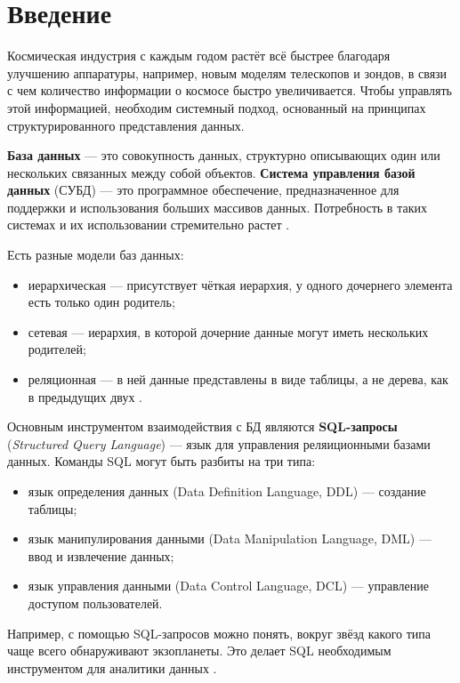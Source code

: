 \documentclass[14pt,a4paper]{extarticle}
\begin{document}
	\tableofcontents
	
	\newpage
	
	\justifying
	
	\section*{Введение}
	Космическая индустрия с каждым годом растёт всё быстрее благодаря улучшению аппаратуры, например, новым моделям телескопов и зондов, в связи с чем количество информации о космосе быстро увеличивается. Чтобы управлять этой информацией, необходим системный подход, основанный на принципах структурированного представления данных.
	
	\textbf{База данных} --- это совокупность данных, структурно описывающих один или нескольких связанных между собой объектов. \textbf{Система управления базой данных} (СУБД) --- это программное обеспечение, предназначенное для поддержки и использования больших массивов данных. Потребность в таких системах и их использовании стремительно растет \cite{cows}.
	
	Есть разные модели баз данных: 
	\begin{itemize}
		\item иерархическая --- присутствует чёткая иерархия, у одного дочернего элемента есть только один родитель;
		\item сетевая --- иерархия, в которой дочерние данные могут иметь нескольких родителей;
		\item реляционная --- в ней данные представлены в виде таблицы, а не дерева, как в предыдущих двух \cite{manga}.
	\end{itemize}
	
	Основным инструментом взаимодействия с БД являются \textbf{SQL-запросы} (\textit{Structured Query Language}) --- язык для управления реляиционными базами данных. Команды SQL могут быть разбиты на три типа:
	\begin{itemize}
		\item язык определения данных (Data Definition Language, DDL) — создание таблицы;
		\item язык манипулирования данными (Data Manipulation Language, DML) — ввод и извлечение данных;
		\item язык управления данными (Data Control Language, DCL) — управление доступом пользователей.
	\end{itemize}
	Например, с помощью SQL-запросов можно понять, вокруг звёзд какого типа чаще всего обнаруживают экзопланеты. Это делает SQL необходимым инструментом для аналитики данных \cite{manga}.
	
\end{document}
